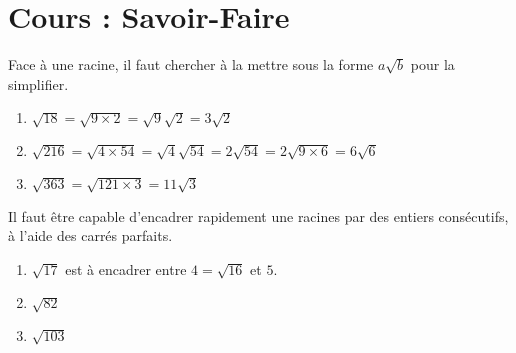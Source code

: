 \documentclass{article}
\begin{document}
\section{Cours : Savoir-Faire}
\begin{example}
Face à une racine, il faut chercher à la mettre sous la forme $a\sqrt{b}$ pour la simplifier.
\begin{enumerate}
\item $\sqrt{18} = \sqrt{9 \times 2} = \sqrt{9}\sqrt{2} = 3\sqrt{2}$
\item $\sqrt{216} = \sqrt{4 \times 54} = \sqrt{4}\sqrt{54} = 2\sqrt{54} = 2\sqrt{9 \times 6} = 6\sqrt{6}$
\item $\sqrt{363} = \sqrt{121 \times 3} = 11\sqrt{3}$
\end{enumerate}    
\end{example}
\begin{example}
Il faut être capable d'encadrer rapidement une racines par des entiers consécutifs, à l'aide des carrés parfaits.
\begin{enumerate}
\item $\sqrt{17}$ est à encadrer entre $4 = \sqrt{16}$ et $5$.
\item $\sqrt{82}$
\item $\sqrt{103}$ 
\end{enumerate}
\end{example}
\end{document}
